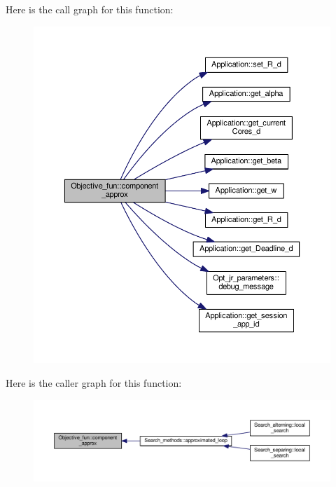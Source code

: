 Here is the call graph for this function\-:
\nopagebreak
\begin{figure}[H]
\begin{center}
\leavevmode
\includegraphics[width=350pt]{classObjective__fun_a551109cf9927773062e9e3668c00eb59_cgraph}
\end{center}
\end{figure}




Here is the caller graph for this function\-:
\nopagebreak
\begin{figure}[H]
\begin{center}
\leavevmode
\includegraphics[width=350pt]{classObjective__fun_a551109cf9927773062e9e3668c00eb59_icgraph}
\end{center}
\end{figure}


